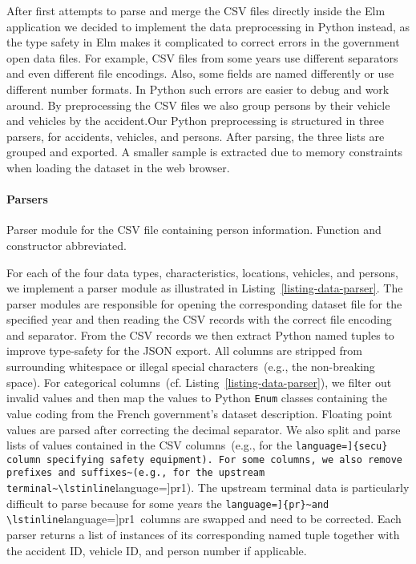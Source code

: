 After first attempts to parse and merge the CSV files directly inside the Elm application we decided to implement the data preprocessing in Python instead, as the type safety in Elm makes it complicated to correct errors in the government open data files. For example, CSV files from some years use different separators and even different file encodings. Also, some fields are named differently or use different number formats. In Python such errors are easier to debug and work around. By preprocessing the CSV files we also group persons by their vehicle and vehicles by the accident.Our Python preprocessing is structured in three parsers, for accidents, vehicles, and persons. After parsing, the three lists are grouped and exported. A smaller sample is extracted due to memory constraints when loading the dataset in the web browser.

\paragraph{Parsers}
\begin{listing}
    
    \caption{Parser module for the CSV file containing person information. Function and constructor abbreviated.}
    \label{listing-data-parser}
\end{listing}
For each of the four data types, characteristics, locations, vehicles, and persons, we implement a parser module as illustrated in Listing~\ref{listing-data-parser}. The parser modules are responsible for opening the corresponding dataset file for the specified year and then reading the CSV records with the correct file encoding and separator. From the CSV records we then extract Python named tuples to improve type-safety for the JSON export. All columns are stripped from surrounding whitespace or illegal special characters~(e.g., the non-breaking space). For categorical columns~(cf. Listing~\ref{listing-data-parser}), we filter out invalid values and then map the values to Python \lstinline[language=Python]{Enum} classes containing the value coding from the French government's dataset description. Floating point values are parsed after correcting the decimal separator. We also split and parse lists of values contained in the CSV columns~(e.g., for the \lstinline[language=]{secu} column specifying safety equipment). For some columns, we also remove prefixes and suffixes~(e.g., for the upstream terminal~\lstinline[language=]{pr1}). The upstream terminal data is particularly difficult to parse because for some years the \lstinline[language=]{pr}~and \lstinline[language=]{pr1}~columns are swapped and need to be corrected. Each parser returns a list of instances of its corresponding named tuple together with the accident ID, vehicle ID, and person number if applicable.

